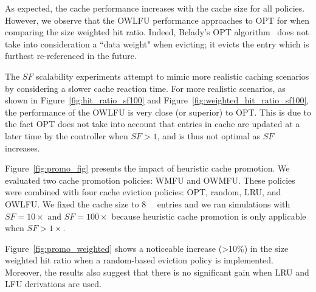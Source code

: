 As expected, the cache performance increases with the cache size for all policies.
However, we observe that the OWLFU performance approaches to OPT for when comparing the size weighted hit ratio.
Indeed, Belady's OPT algorithm~\cite{Belady:66} does not take into consideration a ``data weight" when evicting; it evicts the entry which is furthest re-referenced in the future.

The $SF$ scalability experiments attempt to mimic more realistic caching scenarios by considering a slower cache reaction time.
For more realistic scenarios, as shown in Figure~\ref{fig:hit_ratio_sf100} and Figure~\ref{fig:weighted_hit_ratio_sf100}, the performance of the OWLFU is very close (or superior) to OPT.
This is due to the fact OPT does not take into account that entries in cache are updated at a later time by the controller when $SF>1$, and is thus not optimal as $SF$ increases.

Figure~\ref{fig:promo_fig} presents the impact of heuristic cache promotion. 
We evaluated two cache promotion policies: WMFU and OWMFU.
These policies were combined with four cache eviction policies: OPT, random, LRU, and OWLFU.
We fixed the cache size to \SI{8}{\kilo\nothing} entries and we ran simulations with $SF=10\times$ and $SF=100\times$ because heuristic cache promotion is only applicable when $SF>1\times$.

Figure~\ref{fig:promo_weighted} shows a noticeable increase (>10\%) in the size weighted hit ratio when a random-based eviction policy is implemented.
Moreover, the results also suggest that there is no significant gain when LRU and LFU derivations are used.

